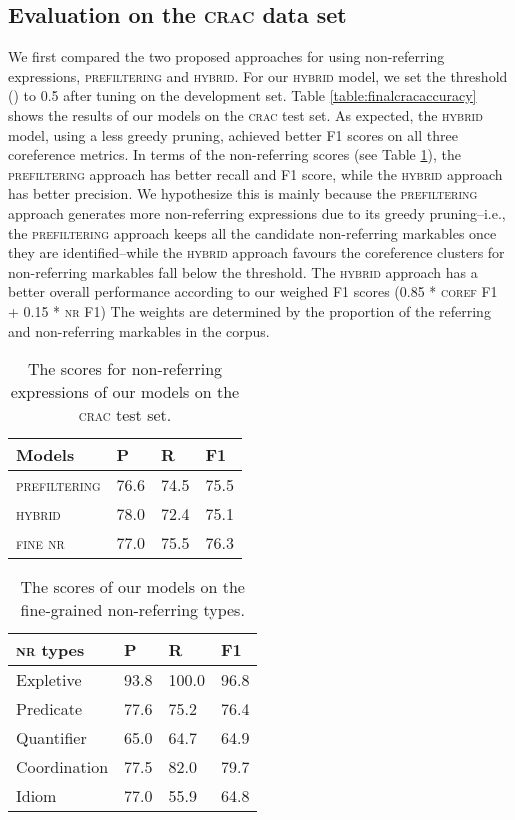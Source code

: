 \documentclass[10pt, a4paper]{article}
\newcommand{\ACRO}[1]{\textsc{#1}}
\newcommand{\CRAC}{\ACRO{crac}}
\newcommand{\NR}{\ACRO{nr}}
\newcommand{\PREFILTERING}{\ACRO{prefiltering}}
\newcommand{\HYBRID}{\ACRO{hybrid}}
\newcommand{\FINENR}{\ACRO{fine nr}}
\begin{document}
\subsection{Evaluation on the {\CRAC} data set}

We first compared the two proposed approaches for using non-referring expressions, {\PREFILTERING} and {\HYBRID}.  
For our {\HYBRID} model, we set the threshold () to 0.5 after tuning on the development set. Table \ref{table:finalcracaccuracy} shows the results of our models on the {\CRAC} test set. 
As expected, the {\HYBRID} model,  using a less greedy pruning, achieved better F1 scores on all three coreference metrics. 
In terms of the non-referring scores (see Table \ref{table:cracnraccuracy}), the {\PREFILTERING} approach has better recall and F1 score, while the {\HYBRID} approach has better precision. 
We hypothesize this is mainly because the {\PREFILTERING} approach generates more non-referring expressions due to its greedy pruning--i.e., the {\PREFILTERING} approach keeps all the candidate non-referring markables once they are identified--while the {\HYBRID} approach  favours  the coreference clusters for non-referring markables fall below the threshold. 
The {\HYBRID} approach has a better overall performance according to our weighed F1 scores (0.85 * \ACRO{coref} F1 + 0.15 * {\NR} F1) The weights are determined by the proportion of the referring and non-referring markables in the corpus.



\begin{table}[t]
\centering
\small
\begin{tabular}{l l l l}
\toprule
Models& P&R&F1\\\midrule
{\PREFILTERING}&76.6&74.5&75.5\\ {\HYBRID}&78.0&72.4&75.1\\{\FINENR}&77.0&75.5&76.3\\
\bottomrule
\end{tabular}
\caption{\label{table:cracnraccuracy} The  scores for non-referring expressions of our models on the {\CRAC} test set.}
\end{table}

\begin{table}[t]
\centering
\small
\begin{tabular}{l l l l}
\toprule
{\NR} types& P&R&F1\\ \midrule
Expletive&93.8&100.0&96.8 \\Predicate&77.6&75.2&76.4 \\Quantifier&65.0&64.7&64.9 \\Coordination&77.5&82.0&79.7 \\Idiom&77.0&55.9&64.8 \\\bottomrule
\end{tabular}
\caption{\label{table:finenraccuracy} The scores of our models on the fine-grained non-referring types.}
\end{table}
\end{document}
